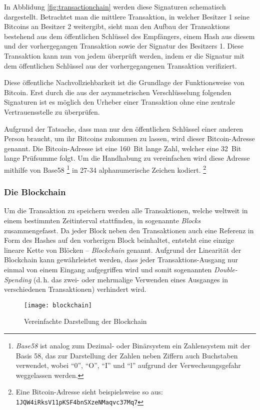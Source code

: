 In Abblidung \ref{fig:transactionchain} werden diese Signaturen schematisch dargestellt.
Betrachtet man die mittlere Transaktion, in welcher Besitzer 1 seine Bitcoins an Besitzer 2 weitergibt, sieht man den Aufbau der Transaktions bestehend aus dem öffentlichen Schlüssel des Empfängers, einem Hash aus diesem und der vorhergegangen Transaktion sowie der Signatur des Besitzers 1.
Diese Transaktion kann nun von jedem überprüft werden, indem er die Signatur mit dem öffentlichen Schlüssel aus der vorhergegangenen Transaktion verifiziert.

Diese öffentliche Nachvollziehbarkeit ist die Grundlage der Funktionsweise von Bitcoin.
Erst durch die aus der asymmetrischen Verschlüsselung folgenden Signaturen ist es möglich den Urheber einer Transaktion ohne eine zentrale Vertrauensstelle zu überprüfen.

Aufgrund der Tatsache, dass man nur den öffentlichen Schlüssel einer anderen Person braucht, um ihr Bitcoins zukommen zu lassen, wird dieser Bitcoin-Adresse genannt.
Die Bitcoin-Adresse ist eine 160~Bit lange Zahl, welcher eine 32~Bit lange Prüfsumme folgt.
Um die Handhabung zu vereinfachen wird diese Adresse mithilfe von Base58%
\footnote{\emph{Base58} ist analog zum Dezimal- oder Binärsystem ein Zahlensystem mit der Basis 58, das zur Darstellung der Zahlen neben Ziffern auch Buchstaben verwendet, wobei "`0"', "`O"', "`I"' und "`l"' aufgrund der Verwechsungsgefahr weggelassen werden.}
in 27-34 alphanumerische Zeichen kodiert.%
\footnote{Eine Bitcoin-Adresse sieht beispielsweise so aus: \texttt{1JQW4iRksV11pKSF4bnSXzeNMaqvc37Mq7}}

\subsubsection{Die Blockchain}

Um die Transaktion zu speichern werden alle Transaktionen, welche weltweit in einem bestimmten Zeitinterval stattfinden, in sogenannte \emph{Blocks} zusammengefasst.
Da jeder Block neben den Transaktionen auch eine Referenz in Form des Hashes auf den vorherigen Block beinhaltet, entsteht eine einzige lineare Kette von Blöcken -- \emph{Blockchain} genannt.
Aufgrund der Linearität der Blockchain kann gewährleistet werden, dass jeder Transaktions-Ausgang nur einmal von einem Eingang aufgegriffen wird und somit sogenannten \emph{Double-Spending} (d.\,h. das zwei- oder mehrmalige Verwenden eines Ausganges in verschiedenen Transaktionen) verhindert wird.

\begin{figure}[htb]
    \begin{center}
        \texttt{[image: blockchain]}
        \caption{Vereinfachte Darstellung der Blockchain \parencite[3]{nakamoto}}
        \label{fig:blockchain}
    \end{center}
\end{figure}

